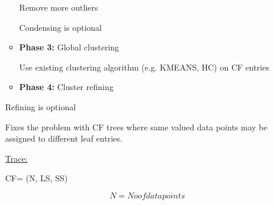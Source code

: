 \documentclass[12pt]{article}
\renewcommand{\_}{\kern-1.5pt\textunderscore\kern-1.5pt}
\begin{document}
\begin{enumerate}
\begin{itemize}
{\fontsize{11pt}{13.2pt}\selectfont \textcolor[HTML]{333333}{Remove more outliers}\par}\par

{\fontsize{11pt}{13.2pt}\selectfont \textcolor[HTML]{333333}{Condensing is optional}\par}\par

	\item {\fontsize{11pt}{13.2pt}\selectfont \textbf{\textcolor[HTML]{333333}{Phase 3:}}\textcolor[HTML]{333333}{ Global clustering}\par}\par

{\fontsize{11pt}{13.2pt}\selectfont \textcolor[HTML]{333333}{Use existing clustering algorithm (e.g. KMEANS, HC) on CF entries}\par}\par

	\item {\fontsize{11pt}{13.2pt}\selectfont \textbf{\textcolor[HTML]{333333}{Phase 4:}}\textcolor[HTML]{333333}{ Cluster refining}\par}
\end{itemize}\par

\begin{adjustwidth}{0.5in}{0.0in}
{\fontsize{11pt}{13.2pt}\selectfont \textcolor[HTML]{333333}{Refining is optional}\par}\par

\end{adjustwidth}

\begin{adjustwidth}{0.5in}{0.0in}
{\fontsize{11pt}{13.2pt}\selectfont \textcolor[HTML]{333333}{Fixes the problem with CF trees where same valued data points may be assigned to different leaf entries.}\par}\par

\end{adjustwidth}

{\fontsize{14pt}{16.8pt}\selectfont \uline{Trace:}\par}\par

{\fontsize{11pt}{13.2pt}\selectfont \textcolor[HTML]{333333}{CF= (N, LS, SS)}\par}\par

 \[ N=No of data points \] \par


\end{enumerate}
\end{document}
